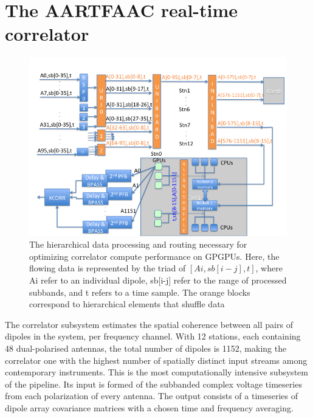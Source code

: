 \documentclass{ws-jai}
\begin{document}
\section {\label{sec:gpucorr} The AARTFAAC real-time correlator}
\begin{figure}[htbp]
\centering
\includegraphics[width=1\textwidth]{Figs/data_routing_transform_hierarchy/Slide1.png}
\caption{The hierarchical  data processing and routing  necessary for optimizing
  correlator  compute  performance   on  GPGPUs.  Here,  the   flowing  data  is
  represented by the triad of $[Ai,sb[i-j],t]$, where Ai refer to an individual
  dipole, sb[i-j] refer  to the range of  processed subbands, and t  refers to a
  time  sample.  The orange  blocks  correspond  to hierarchical  elements  that
  shuffle data }
\label{fig:afaac_station_hw}
\end{figure}

The correlator  subsystem estimates the  spatial coherence between all  pairs of
dipoles in the system, per frequency  channel. With 12 stations, each containing
48 dual-polarised  antennas, the  total number  of dipoles  is 1152,  making the
correlator one with the highest number of spatially distinct input streams among
contemporary instruments.  This is  the most computationally intensive subsystem
of  the  pipeline.   Its  input  is formed  of  the  subbanded  complex  voltage
timeseries from  each polarization of every  antenna.  The output consists  of a
timeseries of dipole array covariance matrices  with a chosen time and frequency
averaging.
\end{document}
